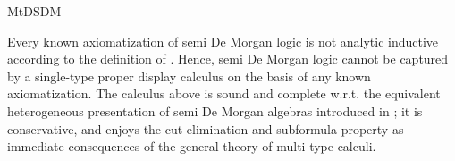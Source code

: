 \begin{entry}{MtDSDM}
\begin{technicalities}
Every known axiomatization of semi De Morgan logic is not analytic inductive according to the definition of \cite{greco2016unified}. Hence, semi De Morgan logic cannot be captured by a single-type proper display calculus on the basis of any known axiomatization. The calculus above is sound and complete w.r.t. the equivalent heterogeneous presentation of semi De Morgan algebras introduced  in \cite{greco2017multi}; it is conservative, and enjoys the cut elimination and subformula property as immediate consequences of the general theory of multi-type calculi.
\end{technicalities}

\end{entry} 